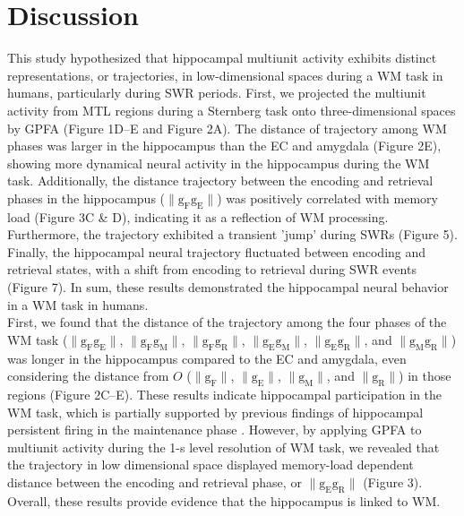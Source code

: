 \documentclass[final,3p,times,twocolumn]{elsarticle}
\begin{document}
\section{Discussion}
This study hypothesized that hippocampal multiunit activity exhibits distinct representations, or trajectories, in low-dimensional spaces during a WM task in humans, particularly during SWR periods. First, we projected the multiunit activity from MTL regions during a Sternberg task onto three-dimensional spaces by GPFA (Figure 1D--E and Figure 2A). The distance of trajectory among WM phases was larger in the hippocampus than the EC and amygdala (Figure 2E), showing more dynamical neural activity in the hippocampus during the WM task. Additionally, the distance trajectory between the encoding and retrieval phases in the hippocampus ($\mathrm{\lVert g_{F}g_{E} \rVert}$) was positively correlated with memory load (Figure 3C \& D), indicating it as a reflection of WM processing. Furthermore, the trajectory exhibited a transient 'jump' during SWRs (Figure 5). Finally, the hippocampal neural trajectory fluctuated between encoding and retrieval states, with a shift from encoding to retrieval during SWR events (Figure 7). In sum, these results demonstrated the hippocampal neural behavior in a WM task in humans.
\\
\indent
First, we found that the distance of the trajectory among the four phases of the WM task ($\mathrm{\lVert g_{F}g_{E} \rVert}$, $\mathrm{\lVert g_{F}g_{M} \rVert}$, $\mathrm{\lVert g_{F}g_{R} \rVert}$, $\mathrm{\lVert g_{E}g_{M} \rVert}$, $\mathrm{\lVert g_{E}g_{R} \rVert}$, and $\mathrm{\lVert g_{M}g_{R} \rVert}$) was longer in the hippocampus compared to the EC and amygdala, even considering the distance from $O$ ($\mathrm{\lVert g_{F} \rVert}$, $\mathrm{\lVert g_{E} \rVert}$, $\mathrm{\lVert g_{M} \rVert}$, and $\mathrm{\lVert g_{R} \rVert}$) in those regions (Figure 2C--E). These results indicate hippocampal participation in the WM task, which is partially supported by previous findings of hippocampal persistent firing in the maintenance phase \cite{boran_persistent_2019} \cite{kaminski_persistently_2017} \cite{kornblith_persistent_2017} \cite{faraut_dataset_2018}. However, by applying GPFA to multiunit activity during the 1-s level resolution of WM task, we revealed that the trajectory in low dimensional space displayed memory-load dependent distance between the encoding and retrieval phase, or $\mathrm{\lVert g_{E}g_{R} \rVert}$ (Figure 3). Overall, these results provide evidence that the hippocampus is linked to WM.
\end{document}

